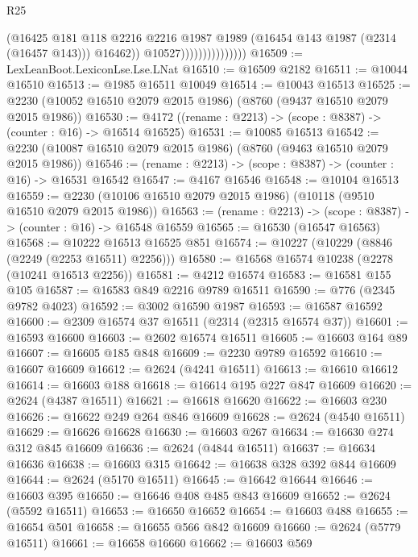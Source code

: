 \begin{lexlean}{R25}
\begin{coremodule}
                                    (@16425
                                      @181
                                      @118
                                      @2216
                                      @2216
                                      @1987
                                      @1989
                                      (@16454 @143 @1987 (@2314 (@16457 @143)))
                                      @16462))
                                  @10527)))))))))))))))
@16509 := LexLeanBoot.LexiconLse.Lse.LNat
@16510 := @16509 @2182
@16511 := @10044 @16510
@16513 := @1985 @16511 @10049
@16514 := @10043 @16513
@16525 := @2230 (@10052 @16510 @2079 @2015 @1986) (@8760 (@9437 @16510 @2079 @2015 @1986))
@16530 := @4172 ((rename : @2213) -> (scope : @8387) -> (counter : @16) -> @16514 @16525)
@16531 := @10085 @16513
@16542 := @2230 (@10087 @16510 @2079 @2015 @1986) (@8760 (@9463 @16510 @2079 @2015 @1986))
@16546 := (rename : @2213) -> (scope : @8387) -> (counter : @16) -> @16531 @16542
@16547 := @4167 @16546
@16548 := @10104 @16513
@16559 := @2230 (@10106 @16510 @2079 @2015 @1986) (@10118 (@9510 @16510 @2079 @2015 @1986))
@16563 := (rename : @2213) -> (scope : @8387) -> (counter : @16) -> @16548 @16559
@16565 := @16530 (@16547 @16563)
@16568 := @10222 @16513 @16525 @851
@16574 := @10227 (@10229 (@8846 (@2249 (@2253 @16511) @2256)))
@16580 := @16568 @16574 @10238 (@2278 (@10241 @16513 @2256))
@16581 := @4212 @16574
@16583 := @16581 @155 @105
@16587 := @16583 @849 @2216 @9789 @16511
@16590 := @776 (@2345 @9782 @4023)
@16592 := @3002 @16590 @1987
@16593 := @16587 @16592
@16600 := @2309 @16574 @37 @16511 (@2314 (@2315 @16574 @37))
@16601 := @16593 @16600
@16603 := @2602 @16574 @16511
@16605 := @16603 @164 @89
@16607 := @16605 @185 @848
@16609 := @2230 @9789 @16592
@16610 := @16607 @16609
@16612 := @2624 (@4241 @16511)
@16613 := @16610 @16612
@16614 := @16603 @188
@16618 := @16614 @195 @227 @847 @16609
@16620 := @2624 (@4387 @16511)
@16621 := @16618 @16620
@16622 := @16603 @230
@16626 := @16622 @249 @264 @846 @16609
@16628 := @2624 (@4540 @16511)
@16629 := @16626 @16628
@16630 := @16603 @267
@16634 := @16630 @274 @312 @845 @16609
@16636 := @2624 (@4844 @16511)
@16637 := @16634 @16636
@16638 := @16603 @315
@16642 := @16638 @328 @392 @844 @16609
@16644 := @2624 (@5170 @16511)
@16645 := @16642 @16644
@16646 := @16603 @395
@16650 := @16646 @408 @485 @843 @16609
@16652 := @2624 (@5592 @16511)
@16653 := @16650 @16652
@16654 := @16603 @488
@16655 := @16654 @501
@16658 := @16655 @566 @842 @16609
@16660 := @2624 (@5779 @16511)
@16661 := @16658 @16660
@16662 := @16603 @569

\end{coremodule}
\end{lexlean}
